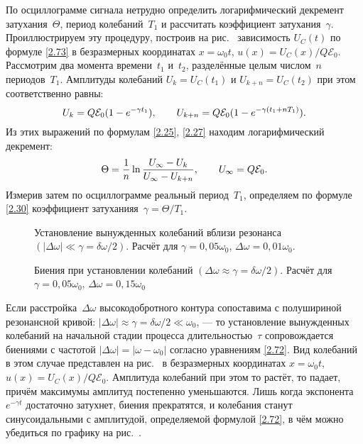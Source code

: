 По осциллограмме сигнала нетрудно определить
логарифмический декремент затухания~$\Theta$, период колебаний~$T_1$ 
и рассчитать коэффициент затухания~$\gamma$. Проиллюстрируем 
эту процедуру, построив на рис.~
зависимость $U_C(t)$ по формуле \eqref{2.73} в безразмерных координатах 
$x = \omega_0t$, $u(x) = U_C(x)/Q\mathcal{E}_0$.
Рассмотрим два момента времени~$t_1$ и~$t_2$, разделённые целым числом~$n$
периодов~$T_1$. Амплитуды колебаний $U_{k}=U_C(t_1)$ и 
$U_{k+n}=U_C(t_2)$ при этом соответственно равны:
\begin{equation*}\eqmark{2.74}
U_{k}=Q\mathcal{E}_0(1-e^{-\gamma t_1}), \qquad U_{k+n}=
Q\mathcal{E}_0(1-e^{-\gamma(t_1+nT_1)}).
\end{equation*}
Из этих выражений по формулам \eqref{2.25}, \eqref{2.27} находим логарифмический 
декремент:
\begin{equation}\eqmark{2.75}
\Theta=\dfrac{1}{n}\ln\dfrac{U_{\infty} -U_{k}}{U_{\infty} -U_{k+n}}, \qquad U_{\infty}  = 
Q\mathcal{E}_0.
\end{equation}
Измерив затем по осциллограмме реальный период~$T_1$, определяем 
по формуле \eqref{2.30} коэффициент затуханияя~$\gamma = \Theta/T_1$.

\begin{figure}[h!]
    \centering
    \caption{Установление вынужденных колебаний вблизи резонанса
        $(|\Delta\omega|\ll\gamma=\delta\omega/2)$. Расчёт для
        $\gamma = 0,05\omega_0$, $\Delta \omega = 0,01\omega_0$.}
\end{figure}

\begin{figure}[h!]
    \centering
    \caption{Биения при установлении колебаний
        $(\Delta\omega\approx\gamma=\delta\omega/2)$. Расчёт для
        $\gamma = 0,05\omega_0$, $\Delta \omega = 0,15\omega_0$}
\end{figure}


Если расстройка~$\Delta\omega$ высокодобротного контура сопоставима с полушириной 
резонансной кривой: $|\Delta\omega|\approx\gamma=\delta\omega/2\ll\omega_0$, --- 
то установление вынужденных колебаний на
начальной стадии процесса длительностью~$\tau$ сопровождается биениями с
частотой $|\Delta\omega|=|\omega-\omega_0|$ согласно уравнениям \eqref{2.72}.
Вид колебаний в этом случае представлен на рис.~ в безразмерных 
координатах $x = \omega_0t$, $u(x) = U_C(x)/Q\mathcal{E}_0$.
Амплитуда колебаний при этом то растёт, то падает, причём максимумы амплитуд
постепенно уменьшаются. Лишь когда экспонента~$e^{-\gamma t}$ достаточно
затухнет, биения прекратятся, и колебания станут синусоидальными с амплитудой, 
определяемой формулой \eqref{2.72}, в чём можно убедиться по графику на 
рис.~.

